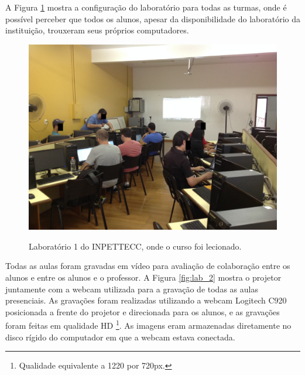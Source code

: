 A Figura \ref{fig:lab_1} mostra a configuração do laboratório para todas as turmas, onde é possível perceber que todos os alunos, apesar da disponibilidade do laboratório da instituição, trouxeram seus próprios computadores.

\begin{figure}[!h]
\centering
\caption{Laboratório 1 do INPETTECC, onde o curso foi lecionado.}
\includegraphics[width=1.0\textwidth]{imgs/lab_1.jpg}
\label{fig:lab_1} 
\end{figure}

Todas as aulas foram gravadas em vídeo para avaliação de colaboração entre os alunos e entre os alunos e o professor. A Figura \ref{fig:lab_2} mostra o projetor juntamente com a webcam utilizada para a gravação de todas as aulas presenciais. As gravações foram realizadas utilizando a webcam Logitech C920 posicionada a frente do projetor e direcionada para os alunos, e as gravações foram feitas em qualidade HD \footnote{Qualidade equivalente a 1220 por 720px.}. As imagens eram armazenadas diretamente no disco rígido do computador em que a webcam estava conectada.

